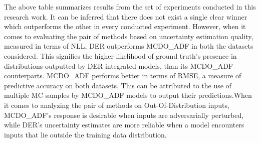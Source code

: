The above table summarizes results from the set of experiments conducted in this research work. It can be inferred that there does not exist a single clear winner which outperforms the other in every conducted experiment. However, when it comes to evaluating the pair of methods based on uncertainty estimation quality, measured in terms of NLL, DER outperforms MCDO\_ADF in both the datasets considered. This signifies the higher likelihood of ground truth's presence in distributions outputted by DER integrated models, than its MCDO\_ADF counterparts. MCDO\_ADF performs better in terms of RMSE, a measure of predictive accuracy on both datasets. This can be attributed to the use of multiple MC samples by MCDO\_ADF models to output their predictions.When it comes to analyzing the pair of methods on Out-Of-Distribution inputs, MCDO\_ADF's response is desirable when inputs are adversarially perturbed, while DER's uncertainty estimates are more reliable when a model encounters inputs that lie outside the training data distribution. 


